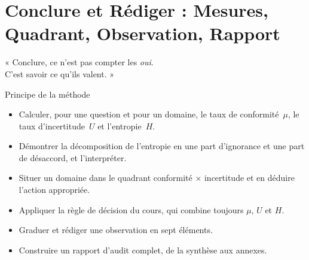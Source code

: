 
\chapter[Conclure et Rédiger]{Conclure et Rédiger : Mesures, Quadrant, Observation, Rapport}
\label{chap:conclure}

\epigraph{%
    « Conclure, ce n'est pas compter les \emph{oui}.\\
    C'est savoir ce qu'ils valent. »%
}{Principe de la méthode}


\begin{boxobjectifs}
\begin{itemize}
    \item Calculer, pour une question et pour un domaine, le taux de
          conformité~$\mu$, le taux d'incertitude~$U$ et l'entropie~$H$.
    \item Démontrer la décomposition de l'entropie en une part
          d'ignorance et une part de désaccord, et l'interpréter.
    \item Situer un domaine dans le quadrant conformité × incertitude et en
          déduire l'action appropriée.
    \item Appliquer la règle de décision du cours, qui combine toujours
          $\mu$, $U$ et $H$.
    \item Graduer et rédiger une observation en sept éléments.
    \item Construire un rapport d'audit complet, de la synthèse aux
          annexes.
\end{itemize}
\end{boxobjectifs}

